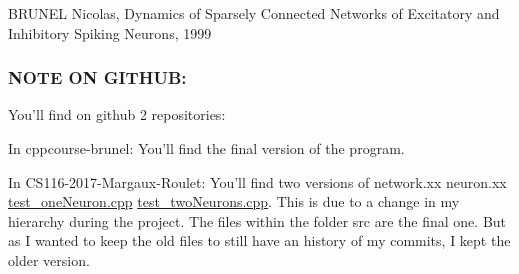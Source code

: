 B\-R\-U\-N\-E\-L Nicolas, Dynamics of Sparsely Connected Networks of Excitatory and Inhibitory Spiking Neurons, 1999

\subsubsection*{N\-O\-T\-E O\-N G\-I\-T\-H\-U\-B\-:}

You'll find on github 2 repositories\-:

In cppcourse-\/brunel\-: You'll find the final version of the program.

In C\-S116-\/2017-\/\-Margaux-\/\-Roulet\-: You'll find two versions of network.\-xx neuron.\-xx \hyperlink{test__oneNeuron_8cpp}{test\-\_\-one\-Neuron.\-cpp} \hyperlink{test__twoNeurons_8cpp}{test\-\_\-two\-Neurons.\-cpp}. This is due to a change in my hierarchy during the project. The files within the folder src are the final one. But as I wanted to keep the old files to still have an history of my commits, I kept the older version. 